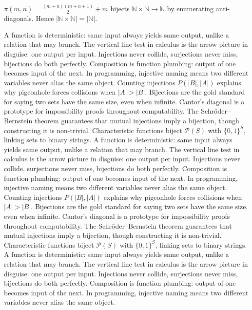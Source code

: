\begin{example}
$\pi(m,n)=\frac{(m+n)(m+n+1)}2+m$ bijects $\mathbb{N}\times\mathbb{N}\to\mathbb{N}$ by enumerating anti-diagonals. Hence $|\mathbb{N}\times\mathbb{N}|=|\mathbb{N}|$.
\end{example}
A function is deterministic: same input always yields same output, unlike a relation that may branch.
The vertical line test in calculus is the arrow picture in disguise: one output per input.
Injections never collide, surjections never miss, bijections do both perfectly.
Composition is function plumbing: output of one becomes input of the next.
In programming, injective naming means two different variables never alias the same object.
Counting injections $P(|B|,|A|)$ explains why pigeonhole forces collisions when $|A|>|B|$.
Bijections are the gold standard for saying two sets have the same size, even when infinite.
Cantor's diagonal is a prototype for impossibility proofs throughout computability.
The Schr\H{o}der--Bernstein theorem guarantees that mutual injections imply a bijection, though constructing it is non-trivial.
Characteristic functions biject $\mathcal{P}(S)$ with $\{0,1\}^S$, linking sets to binary strings.
A function is deterministic: same input always yields same output, unlike a relation that may branch.
The vertical line test in calculus is the arrow picture in disguise: one output per input.
Injections never collide, surjections never miss, bijections do both perfectly.
Composition is function plumbing: output of one becomes input of the next.
In programming, injective naming means two different variables never alias the same object.
Counting injections $P(|B|,|A|)$ explains why pigeonhole forces collisions when $|A|>|B|$.
Bijections are the gold standard for saying two sets have the same size, even when infinite.
Cantor's diagonal is a prototype for impossibility proofs throughout computability.
The Schr\H{o}der--Bernstein theorem guarantees that mutual injections imply a bijection, though constructing it is non-trivial.
Characteristic functions biject $\mathcal{P}(S)$ with $\{0,1\}^S$, linking sets to binary strings.
A function is deterministic: same input always yields same output, unlike a relation that may branch.
The vertical line test in calculus is the arrow picture in disguise: one output per input.
Injections never collide, surjections never miss, bijections do both perfectly.
Composition is function plumbing: output of one becomes input of the next.
In programming, injective naming means two different variables never alias the same object.
